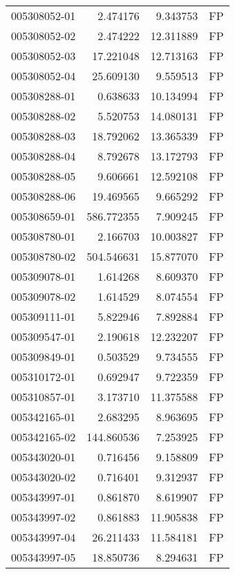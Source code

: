 \begin{tabular}{lrrl}
005308052-01 &    2.474176 &       9.343753 &   FP \\
005308052-02 &    2.474222 &      12.311889 &   FP \\
005308052-03 &   17.221048 &      12.713163 &   FP \\
005308052-04 &   25.609130 &       9.559513 &   FP \\
005308288-01 &    0.638633 &      10.134994 &   FP \\
005308288-02 &    5.520753 &      14.080131 &   FP \\
005308288-03 &   18.792062 &      13.365339 &   FP \\
005308288-04 &    8.792678 &      13.172793 &   FP \\
005308288-05 &    9.606661 &      12.592108 &   FP \\
005308288-06 &   19.469565 &       9.665292 &   FP \\
005308659-01 &  586.772355 &       7.909245 &   FP \\
005308780-01 &    2.166703 &      10.003827 &   FP \\
005308780-02 &  504.546631 &      15.877070 &   FP \\
005309078-01 &    1.614268 &       8.609370 &   FP \\
005309078-02 &    1.614529 &       8.074554 &   FP \\
005309111-01 &    5.822946 &       7.892884 &   FP \\
005309547-01 &    2.190618 &      12.232207 &   FP \\
005309849-01 &    0.503529 &       9.734555 &   FP \\
005310172-01 &    0.692947 &       9.722359 &   FP \\
005310857-01 &    3.173710 &      11.375588 &   FP \\
005342165-01 &    2.683295 &       8.963695 &   FP \\
005342165-02 &  144.860536 &       7.253925 &   FP \\
005343020-01 &    0.716456 &       9.158809 &   FP \\
005343020-02 &    0.716401 &       9.312937 &   FP \\
005343997-01 &    0.861870 &       8.619907 &   FP \\
005343997-02 &    0.861883 &      11.905838 &   FP \\
005343997-04 &   26.211433 &      11.584181 &   FP \\
005343997-05 &   18.850736 &       8.294631 &   FP \\

\end{tabular}
